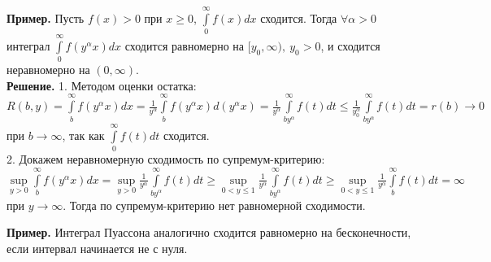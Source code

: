 \textbf{Пример.} Пусть $f(x)>0$ при  $x\geqslant 0$,
$\int\limits_{0}^{\infty} f(x)dx$ сходится.
Тогда $\forall \alpha>0$ интеграл $\int\limits_{0}^{\infty}f(y^\alpha x)dx$
сходится равномерно на $[y_0,\infty),~y_0>0$, и сходится неравномерно
на $(0,\infty)$.\\
\textbf{Решение.} 1. Методом оценки остатка: 
$R(b,y)=\int\limits_{b}^{\infty}f(y^\alpha x)dx=\frac{1}{y^\alpha}
\int\limits_{b}^{\infty} f(y^\alpha x)d(y^\alpha x)=\frac{1}{y^\alpha}
\int\limits_{by^\alpha}^{\infty}f(t)dt\leqslant \frac{1}{y^\alpha_0}
\int\limits_{by^\alpha}^{\infty} f(t)dt=r(b)\to 0$ при $b\to \infty$,
так как $\int\limits_{0}^{\infty} f(t)dt$ сходится.\\
2. Докажем неравномерную сходимость по супремум-критерию:
$\sup\limits_{y>0}\int\limits_{b}^{\infty} f(y^\alpha x)dx=
\sup\limits_{y>0}\frac{1}{y^\alpha}\int\limits_{by^\alpha}^{\infty} f(t)dt
\geqslant
\sup\limits_{0<y\leqslant 1}\frac{1}{y^\alpha}\int\limits_{by^\alpha}^{\infty}
f(t)dt\geqslant
\sup\limits_{0<y\leqslant 1}\frac{1}{y^\alpha}\int\limits_{b}^{\infty}f(t)dt=
\infty$ при $y\to \infty$. Тогда по супремум-критерию нет равномерной 
сходимости.

\textbf{Пример.} Интеграл Пуассона аналогично сходится равномерно на 
бесконечности, если интервал начинается не с нуля. 
